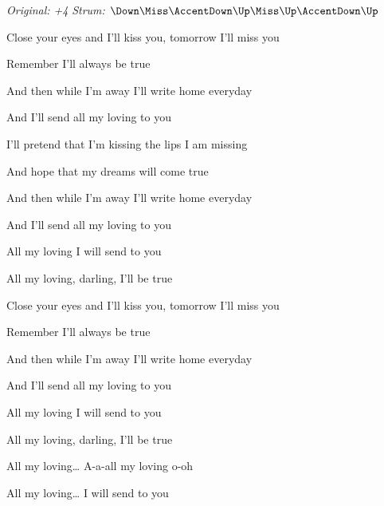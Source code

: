 \begin{song}


\begin{headerbox}
\RaiseBoxWithAccents
\textit{Original: +4} \quad
\textit{Strum:} $\Down\Miss\AccentDown\Up\Miss\Up\AccentDown\Up$
\end{headerbox}

\begin{hchordbox}
\end{hchordbox}

\large

\bigskip

Close your eyes and I'll kiss you, tomorrow I'll miss you \par
Remember I'll always be true  \par
And then while I'm away I'll write home everyday \par
And I'll send all my loving to you \par

\bigskip

I'll pretend that I'm kissing the lips I am missing \par
And hope that my dreams will come true  \par
And then while I'm away I'll write home everyday \par
And I'll send all my loving to you \par

\bigskip

All my loving I will send to you \par
All my loving, darling, I'll be true \par

\bigskip

Close your eyes and I'll kiss you, tomorrow I'll miss you \par
Remember I'll always be true  \par
And then while I'm away I'll write home everyday \par
And I'll send all my loving to you \par

\bigskip

All my loving I will send to you \par
All my loving, darling, I'll be true \par

\bigskip

All my loving… A-a-all my loving o-oh \par
All my loving… I will send to you  \par

\end{song}
